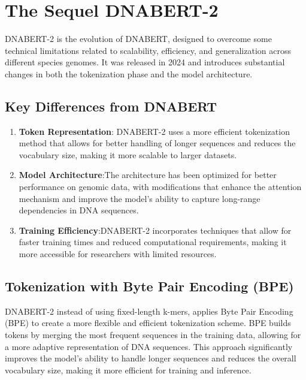 \section{The Sequel DNABERT-2}

DNABERT-2 is the evolution of DNABERT, designed to overcome some technical limitations related to scalability, efficiency, and generalization across different species genomes. It was released in 2024 and introduces substantial changes in both the tokenization phase and the model architecture.

\subsection{Key Differences from DNABERT}

\begin{enumerate}
    \item \textbf{Token Representation}: DNABERT-2 uses a more efficient tokenization method that allows for better handling of longer sequences and reduces the vocabulary size, making it more scalable to larger datasets.
    \item \textbf{Model Architecture}:The architecture has been optimized for better performance on genomic data, with modifications that enhance the attention mechanism and improve the model's ability to capture long-range dependencies in DNA sequences.
    \item \textbf{Training Efficiency}:DNABERT-2 incorporates techniques that allow for faster training times and reduced computational requirements, making it more accessible for researchers with limited resources.
\end{enumerate}

\subsection{Tokenization with Byte Pair Encoding (BPE)}

DNABERT-2 instead of using fixed-length k-mers, applies Byte Pair Encoding (BPE) \cite{sennrich2016neuralmachinetranslationrare} to create a more flexible and efficient tokenization scheme. BPE builds tokens by merging the most frequent sequences in the training data, allowing for a more adaptive representation of DNA sequences. This approach significantly improves the model's ability to handle longer sequences and reduces the overall vocabulary size, making it more efficient for training and inference.

